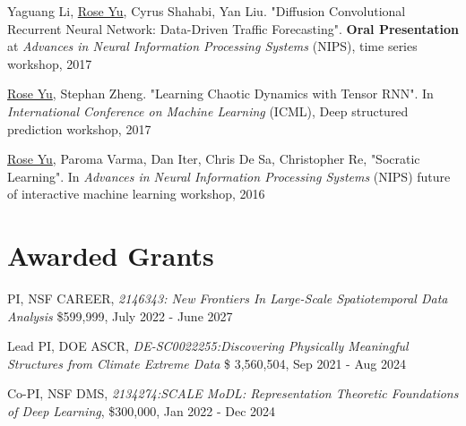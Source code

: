 \documentclass[margin,line]{res}
\begin{document}
\begin{resume}
\begin{enumerate}[label={[W\arabic*]}]
\item Yaguang Li, \underline{Rose Yu}, Cyrus Shahabi, Yan Liu. "Diffusion Convolutional Recurrent Neural Network: Data-Driven Traffic Forecasting". \textbf{Oral Presentation} at \textit{Advances in Neural Information Processing Systems} (NIPS), time series workshop, 2017


\item \underline{Rose Yu}, Stephan Zheng. "Learning Chaotic Dynamics with Tensor RNN". In  \textit{International Conference on Machine Learning} (ICML), Deep structured prediction workshop, 2017

\item \underline{Rose Yu},  Paroma Varma, Dan Iter, Chris De Sa, Christopher Re,  "Socratic Learning".  In \textit{Advances in Neural Information Processing Systems}  (NIPS) future of interactive machine learning workshop, 2016

%
%
%
\end{enumerate}


\section{\sc Awarded Grants}
\begin{enumerate}[label={[G\arabic*]}]

\item PI, NSF CAREER, \textit{2146343: New Frontiers In Large-Scale Spatiotemporal Data Analysis} \$599,999, July 2022 - June 2027
\item Lead PI,  DOE ASCR, \textit{DE-SC0022255:Discovering Physically Meaningful Structures from Climate
Extreme Data} \$ 3,560,504, Sep 2021 - Aug 2024
\item Co-PI, NSF DMS, \textit{2134274:SCALE MoDL: Representation Theoretic Foundations of Deep Learning}, \$300,000, Jan 2022 - Dec 2024


\end{enumerate}
\end{resume}
\end{document}

